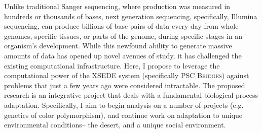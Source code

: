 \documentclass[10.5pt]{article}
\begin{document}
\noindent
Unlike traditional Sanger sequencing, where production was measured in hundreds or thousands of bases, next generation sequencing, specifically, Illumina sequencing, can produce billions of base pairs of data every day from whole genomes, specific tissues, or parts of the genome, during specific stages in an organism’s development.  While this newfound ability to generate massive amounts of data has opened up novel avenues of study, it has challenged the existing computational infrastructure. Here, I propose to leverage the computational power of the XSEDE system (specifically PSC \textsc{Bridges}) against problems that just a few years ago were considered intractable.  The proposed research is an integrative project that deals with a fundamental biological process \textemdash adaptation. Specifically, I aim to begin analysis on a number of projects (e.g. genetics of color polymorphism), and continue work on adaptation to unique environmental conditions-- the desert, and a unique social environment.  \\
\end{document}
